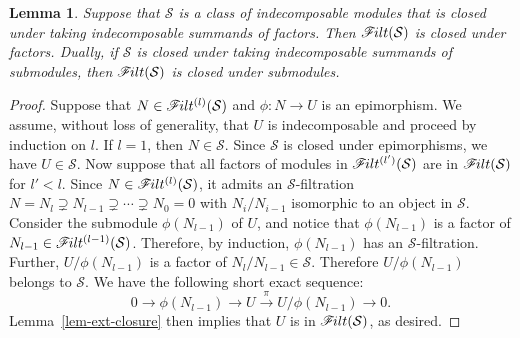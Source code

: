 \documentclass[10pt]{amsart}
\providecommand{\1}{}
\newcommand{\calS}{\mathcal{S}}
\newcommand{\filt}{\mathscr{F}\Mk ilt}
\renewcommand{\1}{\hat{1}}
\newcommand{\0}{\hat{0}}
\newcommand*{\Mk}{\mkern -2mu}
\newtheorem{lemma}[theorem]{Lemma}
\theoremstyle{definition}
\begin{document}
\begin{lemma}\label{lem-epi-closure}
Suppose that $\calS$ is a class of indecomposable modules that is
closed under taking indecomposable summands of factors.
Then $\filt(\calS)$ is closed under factors.
Dually, if $\calS$ is closed under taking indecomposable summands of submodules, then $\filt(\calS)$ is closed under submodules.
\end{lemma}
\begin{proof}
 Suppose that $N\in \filt^{(l)}(\calS)$ and $\phi: N\rightarrow U$ is an epimorphism.
We assume, without loss of generality, that $U$ is indecomposable and proceed by induction on $l$.
If $l=1$, then $N\in \calS$.
Since $\calS$ is closed under epimorphisms, we have $U\in \calS$.
Now suppose that all factors of modules in $\filt^{(l^\prime)}(\calS)$
are in $\filt(\calS)$ for $l'<l$.
Since $N\in \filt^{(l)}(\calS)$, it admits an $\calS$-filtration $N=N_l\supsetneq N_{l-1} \supsetneq \cdots
\supsetneq N_0=0$ with $N_i/N_{i-1}$ isomorphic to an object in
$\calS$. Consider the submodule $\phi(N_{l-1})$ of $U$, and notice that $\phi(N_{l-1})$ is a factor of $N_{l-1}\in \filt^{(l-1)}(\calS)$.
Therefore, by induction, $\phi(N_{l-1})$ has an $\calS$-filtration.
Further, $U/\phi(N_{l-1})$ is a factor of $N_{l}/N_{l-1}\in\calS$.
Therefore $U/\phi(N_{l-1})$ belongs to $\calS$.
We have the following short exact sequence:
 \[
 0\rightarrow \phi(N_{l-1})\rightarrow U\stackrel{\pi}\rightarrow U/\phi(N_{l-1})\rightarrow 0.
 \]
Lemma~\ref{lem-ext-closure} then implies that $U$ is in $\filt(\calS)$, as desired.
\end{proof}
\end{document}
